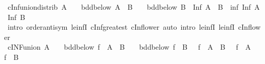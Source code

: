 \begin{isabellebody}
\ cInf{\isacharunderscore}{\kern0pt}union{\isacharunderscore}{\kern0pt}distrib{\isacharcolon}{\kern0pt}\ {\isachardoublequoteopen}A\ {\isasymnoteq}\ {\isacharbraceleft}{\kern0pt}{\isacharbraceright}{\kern0pt}\ {\isasymLongrightarrow}\ bdd{\isacharunderscore}{\kern0pt}below\ A\ {\isasymLongrightarrow}\ B\ {\isasymnoteq}\ {\isacharbraceleft}{\kern0pt}{\isacharbraceright}{\kern0pt}\ {\isasymLongrightarrow}\ bdd{\isacharunderscore}{\kern0pt}below\ B\ {\isasymLongrightarrow}\ Inf\ {\isacharparenleft}{\kern0pt}A\ {\isasymunion}\ B{\isacharparenright}{\kern0pt}\ {\isacharequal}{\kern0pt}\ inf\ {\isacharparenleft}{\kern0pt}Inf\ A{\isacharparenright}{\kern0pt}\ {\isacharparenleft}{\kern0pt}Inf\ B{\isacharparenright}{\kern0pt}{\isachardoublequoteclose}\isanewline
%
\isadelimproof
\ \ %
\endisadelimproof
%
\isatagproof
{}\isamarkupfalse%
\ {\isacharparenleft}{\kern0pt}intro\ order{\isachardot}{\kern0pt}antisym\ le{\isacharunderscore}{\kern0pt}infI\ cInf{\isacharunderscore}{\kern0pt}greatest\ cInf{\isacharunderscore}{\kern0pt}lower{\isacharparenright}{\kern0pt}\ {\isacharparenleft}{\kern0pt}auto\ intro{\isacharcolon}{\kern0pt}\ le{\isacharunderscore}{\kern0pt}infI{}\ le{\isacharunderscore}{\kern0pt}infI{}\ cInf{\isacharunderscore}{\kern0pt}lower{\isacharparenright}{\kern0pt}%
\endisatagproof
{\isafoldproof}%
%
\isadelimproof
\isanewline
%
\endisadelimproof
\isanewline
{}\isamarkupfalse%
\ cINF{\isacharunderscore}{\kern0pt}union{\isacharcolon}{\kern0pt}\ {\isachardoublequoteopen}A\ {\isasymnoteq}\ {\isacharbraceleft}{\kern0pt}{\isacharbraceright}{\kern0pt}\ {\isasymLongrightarrow}\ bdd{\isacharunderscore}{\kern0pt}below\ {\isacharparenleft}{\kern0pt}f\ {\isacharbackquote}{\kern0pt}\ A{\isacharparenright}{\kern0pt}\ {\isasymLongrightarrow}\ B\ {\isasymnoteq}\ {\isacharbraceleft}{\kern0pt}{\isacharbraceright}{\kern0pt}\ {\isasymLongrightarrow}\ bdd{\isacharunderscore}{\kern0pt}below\ {\isacharparenleft}{\kern0pt}f\ {\isacharbackquote}{\kern0pt}\ B{\isacharparenright}{\kern0pt}\ {\isasymLongrightarrow}\ {\isasymSqinter}\ {\isacharparenleft}{\kern0pt}f\ {\isacharbackquote}{\kern0pt}\ {\isacharparenleft}{\kern0pt}A\ {\isasymunion}\ B{\isacharparenright}{\kern0pt}{\isacharparenright}{\kern0pt}\ {\isacharequal}{\kern0pt}\ {\isasymSqinter}\ {\isacharparenleft}{\kern0pt}f\ {\isacharbackquote}{\kern0pt}\ A{\isacharparenright}{\kern0pt}\ {\isasymsqinter}\ {\isasymSqinter}\ {\isacharparenleft}{\kern0pt}f\ {\isacharbackquote}{\kern0pt}\ B{\isacharparenright}{\kern0pt}{\isachardoublequoteclose}\isanewline
%
\isadelimproof
\ \ %

\end{isabellebody}

